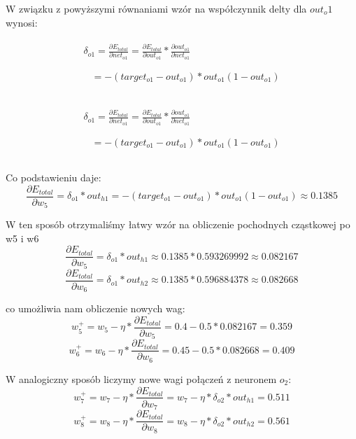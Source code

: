 W związku z powyższymi równaniami wzór na współczynnik delty dla \(out_o1\) wynosi:

\begin{gather}
  \begin{aligned}
    \delta_{o1} = \frac{\partial E_{total}}{\partial net_{o1}} = \frac{\partial E_{total}}{\partial out_{o1}} * \frac{\partial out_{o1}}{\partial net_{o1}}
  \end{aligned}\\
  \begin{aligned}\\
    &= -(target_{o1} - out_{o1}) * out_{o1}(1 - out_{o1}) \\
  \end{aligned}\\
\end{gather}


\begin{gather}
  \begin{aligned}
    \delta_{o1} = \frac{\partial E_{total}}{\partial net_{o1}} = \frac{\partial E_{total}}{\partial out_{o1}} * \frac{\partial out_{o1}}{\partial net_{o1}}
  \end{aligned}\\
  \begin{aligned}\\
    &= -(target_{o1} - out_{o1}) * out_{o1}(1 - out_{o1}) \\
  \end{aligned}\\
\end{gather}

Co podstawieniu daje:
\[
  \frac{\partial E_{total}}{\partial w_{5}} = \delta_{o1}  * out_{h1} = -(target_{o1} - out_{o1}) * out_{o1}(1 - out_{o1}) \approx 0.1385
\]

W ten sposób otrzymaliśmy łatwy wzór na obliczenie pochodnych cząstkowej po w5 i w6
\[
  \frac{\partial E_{total}}{\partial w_{5}} = \delta_{o1}  * out_{h1} \approx  0.1385 * 0.593269992 \approx 0.082167
\]
\[
  \frac{\partial E_{total}}{\partial w_{6}} = \delta_{o1}  * out_{h2} \approx  0.1385 * 0.596884378 \approx 0.082668
\]

co umożliwia nam obliczenie nowych wag:
\[
  w_5^{+} = w_5 - \eta * \frac{\partial E_{total}}{\partial w_{5}} = 0.4 - 0.5 * 0.082167 = 0.359
\]
\[
  w_6^{+} = w_6 - \eta * \frac{\partial E_{total}}{\partial w_{6}} = 0.45 - 0.5 * 0.082668 = 0.409
\]

W analogiczny sposób liczymy nowe wagi połączeń z neuronem \(o_2\):
\[
  w_7^{+} = w_7 - \eta * \frac{\partial E_{total}}{\partial w_{7}} = w_7 - \eta * \delta_{o2}  * out_{h1} = 0.511
\]
\[
  w_8^{+} = w_8 - \eta * \frac{\partial E_{total}}{\partial w_{8}} = w_8 - \eta * \delta_{o2}  * out_{h2} = 0.561
\]

